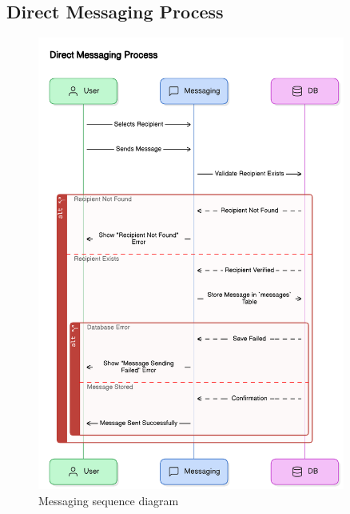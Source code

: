 \subsection{Direct Messaging Process}
\begin{figure}[H]
    \centering
    \includegraphics[width=0.9\textwidth]{latex-doc/images/sequence_diagrams/direct_messaging_process.png}
    \caption{Messaging sequence diagram}
    \label{fig:messaging}
\end{figure}

